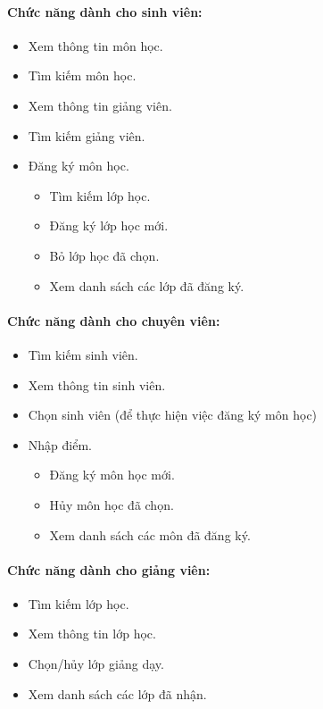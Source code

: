\documentclass[12pt]{article}
\begin{document}
    \paragraph{Chức năng dành cho sinh viên:}
    \begin{itemize}
      \item Xem thông tin môn học.
      \item Tìm kiếm môn học.
      \item Xem thông tin giảng viên.
      \item Tìm kiếm giảng viên.
      \item Đăng ký môn học.
      \begin{itemize}
        \item Tìm kiếm lớp học.
        \item Đăng ký lớp học mới.
        \item Bỏ lớp học đã chọn.
        \item Xem danh sách các lớp đã đăng ký.
      \end{itemize}
    \end{itemize}

    \paragraph{Chức năng dành cho chuyên viên:}
    \begin{itemize}
      \item Tìm kiếm sinh viên.
      \item Xem thông tin sinh viên.
      \item Chọn sinh viên (để thực hiện việc đăng ký môn học)
      \item Nhập điểm.
      \begin{itemize}
        \item Đăng ký môn học mới.
        \item Hủy môn học đã chọn.
        \item Xem danh sách các môn đã đăng ký.
      \end{itemize}
    \end{itemize}

    \paragraph{Chức năng dành cho giảng viên:}
    \begin{itemize}
      \item Tìm kiếm lớp học.
      \item Xem thông tin lớp học.
      \item Chọn/hủy lớp giảng dạy.
      \item Xem danh sách các lớp đã nhận.
    \end{itemize}
\end{document}

